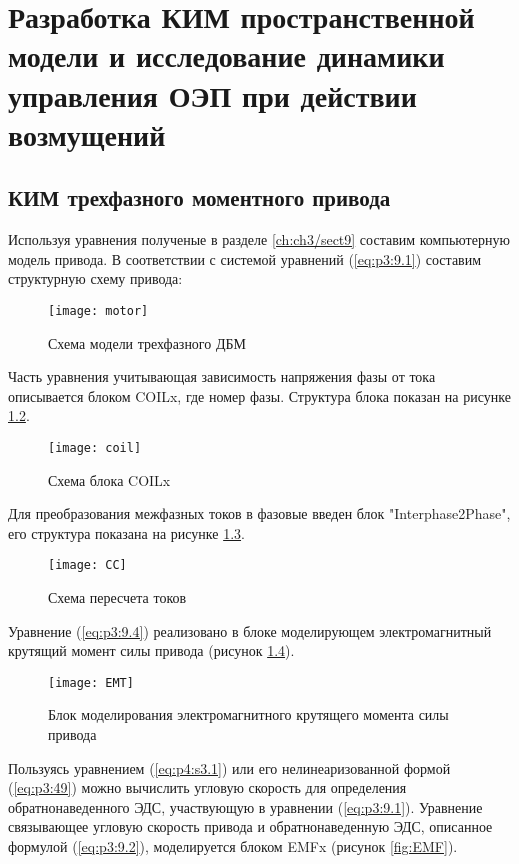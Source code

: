 \chapter{Разработка КИМ пространственной модели и исследование динамики управления ОЭП при действии возмущений} \label{ch:ch5}

\section{КИМ трехфазного моментного привода} \label{ch:ch5/sect1}

Используя уравнения полученые в разделе \ref{ch:ch3/sect9} составим компьютерную модель привода.
В соответствии с системой уравнений (\ref{eq:p3:9.1}) составим структурную схему привода:
\begin{figure}[ht]
	\centering
	\texttt{[image: motor]} 
	\caption{Схема модели трехфазного ДБМ}
	\label{fig:motor}
\end{figure}

Часть уравнения учитывающая зависимость напряжения фазы от тока описывается блоком COILx, где номер фазы. Структура блока показан на рисунке \ref{fig:motor_coil}.

\begin{figure}[ht]
	\centering
	\texttt{[image: coil]} 
	\caption{Схема блока COILx}
	\label{fig:motor_coil}
\end{figure}

Для преобразования межфазных токов в фазовые введен блок "Interphase2Phase", его структура показана на рисунке \ref{fig:CC}.

\begin{figure}[ht]
	\centering
	\texttt{[image: CC]} 
	\caption{Схема пересчета токов}
	\label{fig:CC}
\end{figure}

Уравнение (\ref{eq:p3:9.4}) реализовано в блоке моделирующем электромагнитный крутящий момент силы привода (рисунок \ref{fig:EMT}).

\begin{figure}[ht]
	\centering
	\texttt{[image: EMT]} 
	\caption{Блок моделирования электромагнитного крутящего момента силы привода}
	\label{fig:EMT}
\end{figure}

Пользуясь уравнением (\ref{eq:p4:s3.1}) или его нелинеаризованной формой (\ref{eq:p3:49}) можно вычислить угловую скорость для определения обратнонаведенного ЭДС, участвующую в уравнении (\ref{eq:p3:9.1}). Уравнение связывающее угловую скорость привода и обратнонаведенную ЭДС, описанное формулой (\ref {eq:p3:9.2}), моделируется блоком EMFx (рисунок \ref{fig:EMF}).

